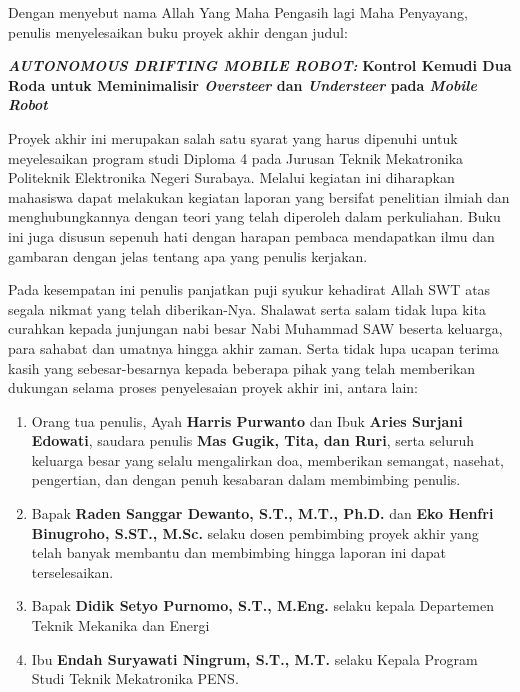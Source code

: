 
\begin{dedication} 
\begin{changemargin}{5mm}{-5mm}
Dengan menyebut nama Allah Yang Maha Pengasih lagi Maha Penyayang, penulis menyelesaikan buku proyek akhir dengan judul:

\begin{center}
\textbf{\textit{AUTONOMOUS DRIFTING MOBILE ROBOT:}}
\textbf{Kontrol Kemudi Dua Roda untuk Meminimalisir \textit{Oversteer} dan \textit{Understeer} pada \textit{Mobile Robot}}
\end{center}

Proyek akhir ini merupakan salah satu syarat yang harus dipenuhi untuk meyelesaikan program studi Diploma 4 pada Jurusan Teknik Mekatronika Politeknik Elektronika Negeri Surabaya. Melalui kegiatan ini diharapkan mahasiswa dapat melakukan kegiatan laporan yang bersifat penelitian ilmiah dan menghubungkannya dengan teori yang telah diperoleh dalam perkuliahan. Buku ini juga disusun sepenuh hati dengan harapan pembaca mendapatkan ilmu dan gambaran dengan jelas tentang apa yang penulis kerjakan.

Pada kesempatan ini penulis panjatkan puji syukur kehadirat Allah SWT atas segala nikmat yang telah diberikan-Nya. Shalawat serta salam tidak lupa kita curahkan kepada junjungan nabi besar Nabi Muhammad SAW beserta keluarga, para sahabat dan umatnya hingga akhir zaman. Serta tidak lupa ucapan terima kasih yang sebesar-besarnya kepada beberapa pihak yang telah memberikan dukungan selama proses penyelesaian proyek akhir ini, antara lain:

\begin{enumerate}
    \item Orang tua penulis, Ayah \textbf{Harris Purwanto} dan Ibuk \textbf{Aries Surjani Edowati}, saudara penulis \textbf{Mas Gugik, Tita, dan Ruri}, serta seluruh keluarga besar yang selalu mengalirkan doa, memberikan semangat, nasehat, pengertian, dan dengan penuh kesabaran dalam membimbing penulis.
    \item Bapak \textbf{Raden Sanggar Dewanto, S.T., M.T., Ph.D.} dan \textbf{Eko Henfri Binugroho, S.ST., M.Sc.} selaku dosen pembimbing proyek akhir yang telah banyak membantu dan membimbing hingga laporan ini dapat terselesaikan.
    \item Bapak \textbf{Didik Setyo Purnomo, S.T., M.Eng.} selaku kepala Departemen Teknik Mekanika dan Energi
    \item Ibu \textbf{Endah Suryawati Ningrum, S.T., M.T.} selaku Kepala Program Studi Teknik Mekatronika PENS.
    \setcounter{nameOfYourChoice}{\value{enumi}}
\end{enumerate}\end{changemargin}

\end{dedication}
